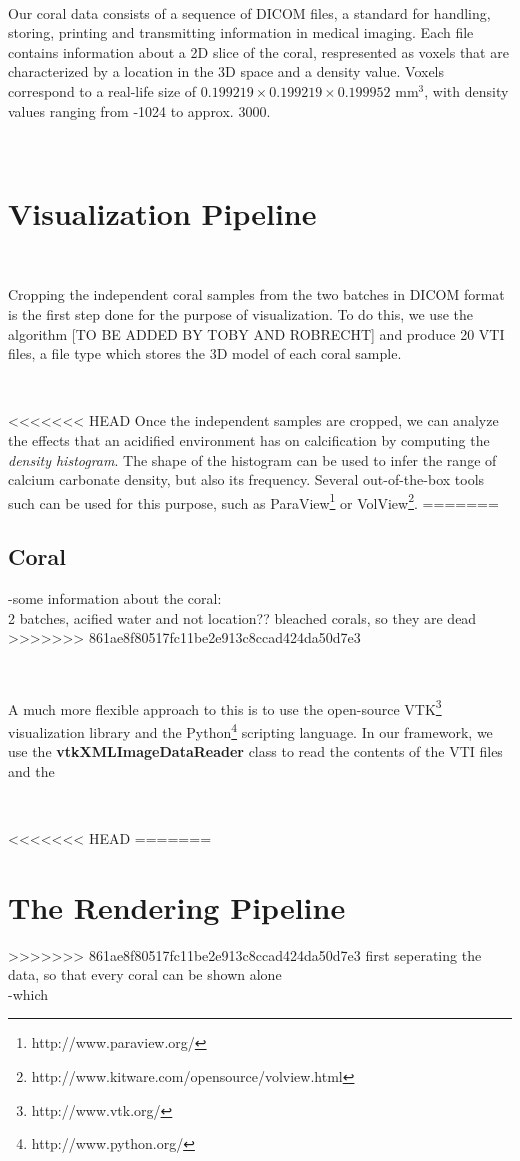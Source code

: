 \documentclass[12pt]{article}
\begin{document}
\

Our coral data consists of a sequence of DICOM files, a standard for handling, storing, printing and transmitting information in medical imaging. Each file contains information about a 2D slice of the coral, respresented as voxels that are characterized by a location in the 3D space and a density value. Voxels correspond to a real-life size of $0.199219 \times 0.199219 \times 0.199952$ mm$^3$, with density values ranging from -1024 to approx. 3000.

\

\section{Visualization Pipeline}

\

Cropping the independent coral samples from the two batches in DICOM format is the first step done for the purpose of visualization. To do this, we use the algorithm [TO BE ADDED BY TOBY AND ROBRECHT] and produce 20 VTI files, a file type which stores the 3D model of each coral sample.

\

<<<<<<< HEAD
Once the independent samples are cropped, we can analyze the effects that an acidified environment has on calcification by computing the \emph{density histogram}. The shape of the histogram can be used to infer the range of calcium carbonate density, but also its frequency. Several out-of-the-box tools such can be used for this purpose, such as ParaView\footnote{http://www.paraview.org/} or VolView\footnote{http://www.kitware.com/opensource/volview.html}.
=======
\subsection{Coral}
-some information about the coral:\\
2 batches, acified water and not
location??
bleached corals, so they are dead
>>>>>>> 861ae8f80517fc11be2e913c8ccad424da50d7e3

\

A much more flexible approach to this is to use the open-source VTK\footnote{http://www.vtk.org/} visualization library and the Python\footnote{http://www.python.org/} scripting language. In our framework, we use the {\bf vtkXMLImageDataReader} class to read the contents of the VTI files and the 

\

<<<<<<< HEAD
=======
\section{The Rendering Pipeline}
>>>>>>> 861ae8f80517fc11be2e913c8ccad424da50d7e3
first seperating the data, so that every coral can be shown alone\\
-which 
\end{document}
